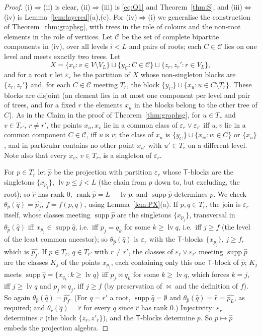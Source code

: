 \documentclass[11pt]{amsart}
\theoremstyle{definition}
\newcommand{\supp}{\operatorname{supp}}
\newcommand{\T}{\mathsf{T}}
\newcommand{\rk}{\operatorname{rank}}
\newcommand{\mt}{\bowtie}   %
\begin{document}
\begin{proof}
(i)$\Rightarrow$(ii) is clear, (ii)$\Rightarrow$(iii) is \eqref{eq:Q1} and Theorem~\ref{thm:S}, and (iii)$\Leftrightarrow$(iv) is Lemma~\ref{lem:layered}(a),(c). For (iv)$\Rightarrow$(i) we generalise the construction of Theorem~\ref{thm:graphsg}, with trees in the role of colours and the non-root elements in the role of vertices. Let $\mathcal C$ be the set of complete bipartite components in (iv), over all levels $i<L$ and pairs of roots; each $C\in\mathcal C$ lies on one level and meets exactly two trees. Let
\[
X=\{x_v: v\in V\setminus V_L\}\sqcup\{y_C:C\in\mathcal C\}\sqcup\{z_r,z_r': r\in V_L\},
\]
and for a root $r$ let $\varepsilon_r$ be the partition of $X$ whose non-singleton blocks are $\{z_r,z_r'\}$ and, for each $C\in\mathcal C$ meeting $T_r$, the block $\{y_C\}\cup\{x_u: u\in C\setminus T_r\}$. These blocks are disjoint (an element lies in at most one component per level and pair of trees, and for a fixed $r$ the elements $x_u$ in the blocks belong to the other tree of $C$). As in the Claim in the proof of Theorem~\ref{thm:graphsg}, for $u\in T_r$ and $v\in T_{r'}$, $r\ne r'$, the points $x_u,x_v$ lie in a common class of $\varepsilon_r\vee\varepsilon_{r'}$ iff $u,v$ lie in a common component $C\in\mathcal C$, iff $u\mt v$; the class of $x_u$ is $\{y_C\}\cup\{x_w:w\in C\}$ or $\{x_u\}$, and in particular contains no other point $x_{u'}$ with $u'\in T_r$ on a different level. Note also that every $x_v$, $v\in T_r$, is a singleton of $\varepsilon_r$.

For $p\in T_r$ let $\hat p$ be the projection with partition $\varepsilon_r$ whose $\T$-blocks are the singletons $\{x_{p_j}\}$, $\operatorname{lv}p\le j<L$ (the chain from $p$ down to, but excluding, the root); so $\hat r$ has rank $0$, $\rk\hat p=L-\operatorname{lv}p$, and $\supp\hat p$ determines $p$. We check $\theta_{\hat p}(\hat q)=\widehat{p_f}$, $f=f(p,q)$, using Lemma~\ref{lem:PX}(a). If $p,q\in T_r$, the join is $\varepsilon_r$ itself, whose classes meeting $\supp\hat p$ are the singletons $\{x_{p_j}\}$, transversal in $\theta_{\hat p}(\hat q)$ iff $x_{p_j}\in\supp\hat q$, i.e.\ iff $p_j=q_k$ for some $k\ge\operatorname{lv}q$, i.e.\ iff $j\ge f$ (the level of the least common ancestor); so $\theta_{\hat p}(\hat q)$ is $\varepsilon_r$ with the $\T$-blocks $\{x_{p_j}\}$, $j\ge f$, which is $\widehat{p_f}$. If $p\in T_r$, $q\in T_{r'}$ with $r\ne r'$, the classes of $\varepsilon_r\vee\varepsilon_{r'}$ meeting $\supp\hat p$ are the classes $K_j$ of the points $x_{p_j}$, each containing only this one $\T$-block of $\hat p$; $K_j$ meets $\supp\hat q=\{x_{q_k}:k\ge\operatorname{lv}q\}$ iff $p_j\mt q_k$ for some $k\ge\operatorname{lv}q$, which forces $k=j$, iff $j\ge\operatorname{lv}q$ and $p_j\mt q_j$, iff $j\ge f$ (by preservation of $\mt$ and the definition of $f$). So again $\theta_{\hat p}(\hat q)=\widehat{p_f}$. (For $q=r'$ a root, $\supp\hat q=\emptyset$ and $\theta_{\hat p}(\hat q)=\hat r=\widehat{p_L}$, as required; and $\theta_{\hat r}(\hat q)=\hat r$ for every $q$ since $\hat r$ has rank $0$.) Injectivity: $\varepsilon_r$ determines $r$ (the block $\{z_r,z'_r\}$), and the $\T$-blocks determine $p$. So $p\mapsto\hat p$ embeds the projection algebra.


\end{proof}
\end{document}
